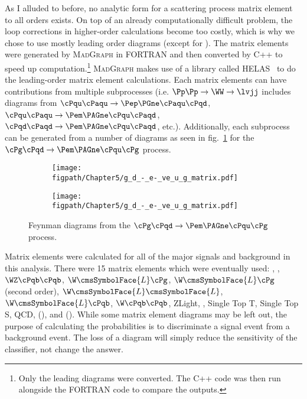 As I alluded to before, no analytic form for a scattering process matrix element to all orders exists.
On top of an already computationally difficult problem, the loop corrections in higher-order calculations become too costly, which is why we chose to use mostly leading order diagrams (except for \Wjets).
The matrix elements were generated by \textsc{Mad}\textsc{Graph} in FORTRAN and then converted by C++ to speed up computation.\footnote{Only the leading diagrams were converted. The C++ code was then run alongside the FORTRAN code to compare the outputs.}
\textsc{Mad}\textsc{Graph} makes use of a library called HELAS~\cite{Murayama:1992gi} to do the leading-order matrix element calculations.
Each matrix elements can have contributions from multiple subprocesses (i.e. $\Pp\Pp\rightarrow\WW\rightarrow\lvjj$ includes diagrams from $\cPqu\cPaqu\rightarrow\Pep\PGne\cPaqu\cPqd$, $\cPqu\cPaqu\rightarrow\Pem\PAGne\cPqu\cPaqd$, $\cPqd\cPaqd\rightarrow\Pem\PAGne\cPqu\cPaqd$, etc.).
Additionally, each subprocess can be generated from a number of diagrams as seen in fig.~\ref{fig:MadGraph5_example_subdiagrams} for the $\cPg\cPqd\rightarrow\Pem\PAGne\cPqu\cPg$ process.

\begin{figure}[!hbt]
    \centering
    \begin{subfigure}[t]{0.9\textwidth}
        \texttt{[image: \\figpath/Chapter5/g\_d\_-\_e-\_ve\_u\_g\_matrix.pdf]}
    \end{subfigure}

    \begin{subfigure}[t]{0.9\textwidth}
        \texttt{[image: \\figpath/Chapter5/g\_d\_-\_e-\_ve\_u\_g\_matrix.pdf]}
    \end{subfigure}
    \caption{Feynman diagrams from the $\cPg\cPqd\rightarrow\Pem\PAGne\cPqu\cPg$ process.}
    \label{fig:MadGraph5_example_subdiagrams}
\end{figure}

Matrix elements were calculated for all of the major signals and background in this analysis.
There were 15 matrix elements which were eventually used: \WW, \WZ, $\WZ\cPqb\cPqb$, $\W\cmsSymbolFace{L}\cPg$, $\W\cmsSymbolFace{L}\cPg$ (second order), $\W\cmsSymbolFace{L}\cmsSymbolFace{L}$, $\W\cmsSymbolFace{L}\cPqb$, $\W\cPqb\cPqb$, ZLight, \ttbar, Single Top T, Single Top S, QCD, \ggH (\joinsym{\MH}{=}{125\gev}), and \WH (\joinsym{\MH}{=}{125\gev}).
While some matrix element diagrams may be left out, the purpose of calculating the probabilities is to discriminate a signal event from a background event.
The loss of a diagram will simply reduce the sensitivity of the classifier, not change the answer.

